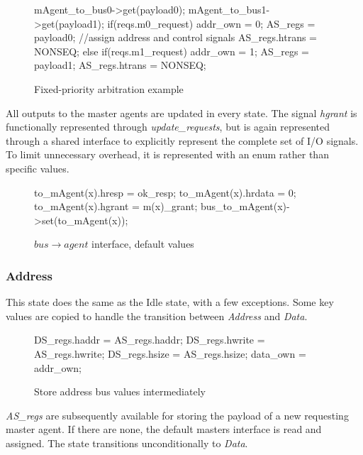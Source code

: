 \begin{figure}[hbt]
\begin{C++}
 mAgent_to_bus0->get(payload0);
 mAgent_to_bus1->get(payload1);
 if(reqs.m0_request){
   addr_own = 0;
   AS_regs = payload0;     //assign address and control signals
   AS_regs.htrans = NONSEQ;
 }else if(reqs.m1_request){
   addr_own = 1;
   AS_regs = payload1;
   AS_regs.htrans = NONSEQ;
 }
\end{C++}
\caption{Fixed-priority arbitration example}
\label{fig:fixed-prio-example}
\end{figure}

All outputs to the master agents are updated in every state.
The signal \textit{hgrant} is functionally represented through \textit{update\_requests}, but is again represented through a shared interface to explicitly represent the complete set of I/O signals. To limit unnecessary overhead, it is represented with an enum rather than specific values.  
\begin{figure}[hbt]
\begin{C++}
to_mAgent(x).hresp = ok_resp; 
to_mAgent(x).hrdata = 0; 
to_mAgent(x).hgrant = m(x)_grant;
bus_to_mAgent(x)->set(to_mAgent(x)); 
\end{C++}
\caption{$bus\rightarrow agent$ interface, default values}
\label{fig:agent-output}
\end{figure}

		
\subsubsection{Address}
This state does the same as the Idle state, with a few exceptions. Some key values are copied to handle the transition between \textit{Address} and \textit{Data}.
\begin{figure}[hbt]
\begin{C++}
DS_regs.haddr = AS_regs.haddr; 
DS_regs.hwrite = AS_regs.hwrite; 
DS_regs.hsize = AS_regs.hsize; 
data_own = addr_own;
\end{C++}
\caption{Store address bus values intermediately}
\end{figure}

\textit{AS\_regs} are subsequently available for storing the payload of a new requesting master agent. If there are none, the default masters interface is read and assigned. The state transitions unconditionally to \textit{Data}.
\newpage
